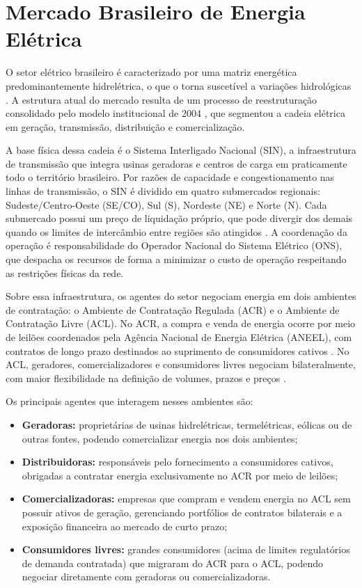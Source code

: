 \section{Mercado Brasileiro de Energia Elétrica}
\label{sec:mercado_energia}

O setor elétrico brasileiro é caracterizado por uma matriz energética predominantemente hidrelétrica, o que o torna suscetível a variações hidrológicas \cite{mme2002,epe2025ben}. A estrutura atual do mercado resulta de um processo de reestruturação consolidado pelo modelo institucional de 2004 \cite{lei10848}, que segmentou a cadeia elétrica em geração, transmissão, distribuição e comercialização.

A base física dessa cadeia é o Sistema Interligado Nacional (SIN), a infraestrutura de transmissão que integra usinas geradoras e centros de carga em praticamente todo o território brasileiro. Por razões de capacidade e congestionamento nas linhas de transmissão, o SIN é dividido em quatro submercados regionais: Sudeste/Centro-Oeste (SE/CO), Sul (S), Nordeste (NE) e Norte (N). Cada submercado possui um preço de liquidação próprio, que pode divergir dos demais quando os limites de intercâmbio entre regiões são atingidos \cite{ccee2024a}. A coordenação da operação é responsabilidade do Operador Nacional do Sistema Elétrico (ONS), que despacha os recursos de forma a minimizar o custo de operação respeitando as restrições físicas da rede.

Sobre essa infraestrutura, os agentes do setor negociam energia em dois ambientes de contratação: o Ambiente de Contratação Regulada (ACR) e o Ambiente de Contratação Livre (ACL). No ACR, a compra e venda de energia ocorre por meio de leilões coordenados pela Agência Nacional de Energia Elétrica (ANEEL), com contratos de longo prazo destinados ao suprimento de consumidores cativos \cite{ccee2024a}. No ACL, geradores, comercializadores e consumidores livres negociam bilateralmente, com maior flexibilidade na definição de volumes, prazos e preços \cite{ccee2024d}.

Os principais agentes que interagem nesses ambientes são:
\begin{itemize}
  \item \textbf{Geradoras:} proprietárias de usinas hidrelétricas, termelétricas, eólicas ou de outras fontes, podendo comercializar energia nos dois ambientes;
  \item \textbf{Distribuidoras:} responsáveis pelo fornecimento a consumidores cativos, obrigadas a contratar energia exclusivamente no ACR por meio de leilões;
  \item \textbf{Comercializadoras:} empresas que compram e vendem energia no ACL sem possuir ativos de geração, gerenciando portfólios de contratos bilaterais e a exposição financeira ao mercado de curto prazo;
  \item \textbf{Consumidores livres:} grandes consumidores (acima de limites regulatórios de demanda contratada) que migraram do ACR para o ACL, podendo negociar diretamente com geradoras ou comercializadoras.
\end{itemize}

